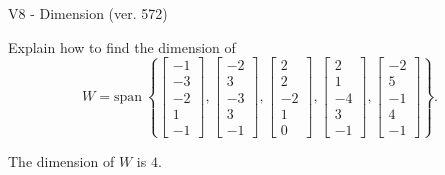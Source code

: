 \begin{exercise}
  \begin{exerciseTitle}V8 - Dimension (ver. 572)\end{exerciseTitle}
  \begin{exerciseStatement}
    Explain how to find the dimension of 
\[W=\mathrm{span}\ \left\{\left[\begin{array}{r}
-1 \\
-3 \\
-2 \\
1 \\
-1
\end{array}\right] , \left[\begin{array}{r}
-2 \\
3 \\
-3 \\
3 \\
-1
\end{array}\right] , \left[\begin{array}{r}
2 \\
2 \\
-2 \\
1 \\
0
\end{array}\right] , \left[\begin{array}{r}
2 \\
1 \\
-4 \\
3 \\
-1
\end{array}\right] , \left[\begin{array}{r}
-2 \\
5 \\
-1 \\
4 \\
-1
\end{array}\right]\right\}.\]



  \end{exerciseStatement}
  \begin{exerciseAnswer}
   The dimension of \(W\) is  \(4\).
  


  \end{exerciseAnswer}
\end{exercise}